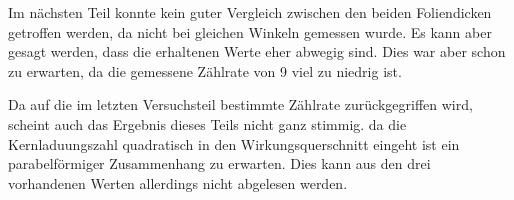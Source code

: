Im nächsten Teil konnte kein guter Vergleich zwischen den beiden Foliendicken getroffen werden, da nicht bei gleichen Winkeln gemessen wurde.
Es kann aber gesagt werden, dass die erhaltenen Werte eher abwegig sind.
Dies war aber schon zu erwarten, da die gemessene Zählrate von 9 viel zu niedrig ist.

Da auf die im letzten Versuchsteil bestimmte Zählrate zurückgegriffen wird, scheint auch das Ergebnis dieses Teils nicht ganz stimmig.
da die Kernladuungszahl quadratisch in den Wirkungsquerschnitt eingeht ist ein parabelförmiger Zusammenhang zu erwarten.
Dies kann aus den drei vorhandenen Werten allerdings nicht abgelesen werden.
